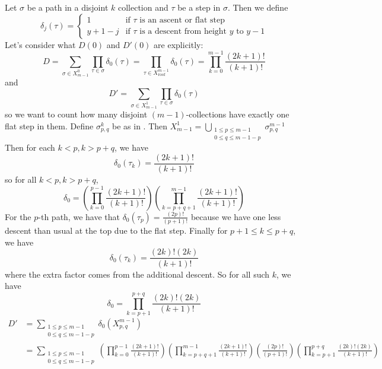 \documentclass[11pt]{article}
\theoremstyle{definition}
\theoremstyle{definition}
\theoremstyle{plain}
\theoremstyle{plain}
\theoremstyle{plain}
\theoremstyle{definition}
\begin{document}
Let $\sigma$ be a path in a disjoint $k$ collection and $\tau$ be a step in $\sigma$. Then we define
\begin{equation*}
\delta_j(\tau) = \begin{cases} 1 &\text{if $\tau$ is an ascent or flat step} \\
y+1-j &\text{if $\tau$ is a descent from height $y$ to $y-1$} \end{cases}
\end{equation*}
Let's consider what $D(0)$ and $D'(0)$ are explicitly:
\begin{equation*}
D = \sum\limits_{\sigma\in X_{m-1}^0}\prod\limits_{\tau\in\sigma}\delta_0(\tau) = \prod\limits_{\tau\in X_{\text{roof}}^{m-1}}\delta_0(\tau) = \prod\limits_{k=0}^{m-1}\frac{(2k+1)!}{(k+1)!}
\end{equation*}
and
\begin{equation*}
D' = \sum\limits_{\sigma\in X_{m-1}^1}\prod\limits_{\tau\in\sigma}\delta_0(\tau)
\end{equation*}
so we want to count how many disjoint $(m-1)$-collections have exactly one flat step in them. Define $\sigma^k_{p,q}$ be as in \cite{meckes_magnitude_2019}. Then $X_{m-1}^1 = \bigcup\limits_{\substack{1\leq p\leq m-1\\0\leq q\leq m-1-p}}\sigma^{m-1}_{p,q}$ Then for each $k < p, k > p+q$, we have
\begin{equation*}
\delta_0(\tau_k) = \frac{(2k+1)!}{(k+1)!}
\end{equation*}
so for all $k < p, k > p+q$,
\begin{equation*}
\delta_0 = \left(\prod\limits_{k=0}^{p-1}\frac{(2k+1)!}{(k+1)!}\right)\left(\prod\limits_{k=p+q+1}^{m-1}\frac{(2k+1)!}{(k+1)!}\right)
\end{equation*}
For the $p$-th path, we have that $\delta_0(\tau_p) = \frac{(2p)!}{(p+1)!}$ because we have one less descent than usual at the top due to the flat step. Finally for $p+1\leq k \leq p+q$, we have
\begin{equation*}
\delta_0(\tau_k) = \frac{(2k)!(2k)}{(k+1)!}
\end{equation*}
where the extra factor comes from the additional descent. So for all such $k$, we have
\begin{equation*}
\delta_0 = \prod\limits_{k=p+1}^{p+q}\frac{(2k)!(2k)}{(k+1)!}
\end{equation*}
\begin{align*}
D' &= \sum\limits_{\substack{1\leq p\leq m-1\\0\leq q\leq m-1-p}}\delta_0(X_{p,q}^{m-1}) \\
&= \sum\limits_{\substack{1\leq p\leq m-1\\0\leq q\leq m-1-p}}\left(\prod\limits_{k=0}^{p-1}\frac{(2k+1)!}{(k+1)!}\right)\left(\prod\limits_{k=p+q+1}^{m-1}\frac{(2k+1)!}{(k+1)!}\right)\left(\frac{(2p)!}{(p+1)!}\right)\left(\prod\limits_{k=p+1}^{p+q}\frac{(2k)!(2k)}{(k+1)!}\right)
\end{align*}
\end{document}
